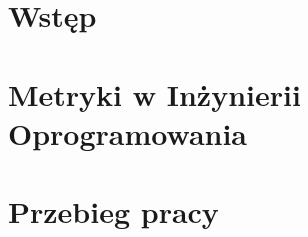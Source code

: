 \chapter{Wstęp}




\chapter{Metryki w Inżynierii Oprogramowania}




\chapter{Przebieg pracy}






